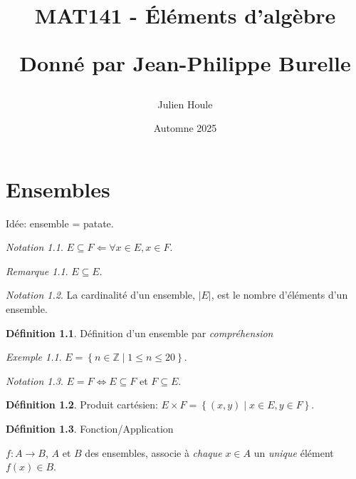 \documentclass{report}
\title{MAT141 - \'El\'ements d'alg\`ebre

Donn\'e par Jean-Philippe Burelle}
\author{Julien Houle}
\date{Automne 2025}
\newcommand*{\card}[1]{\left| #1 \right|}
\newcommand*{\lte}{\leqslant}
\newcommand*{\entiers}{\mathbb{Z}}
\theoremstyle{definition}
\newtheorem*{defin}{D\'efinition}
\theoremstyle{remark}
\newtheorem*{exem}{Exemple}
\newtheorem*{nota}{Notation}
\newtheorem*{rema}{Remarque}
\begin{document}
	\maketitle
	\tableofcontents
	\newpage

	\chapter{Ensembles}
	Id\'ee: ensemble = patate.


	\begin{nota}
		$E \subseteq F \Leftarrow \forall x \in E, x \in F$.
		\begin{rema}
			$E \subseteq E$.
		\end{rema}
	\end{nota}

	\begin{nota}
		La cardinalit\'e d'un ensemble, $\card{E}$, est le nombre d'\'el\'ements d'un ensemble.
	\end{nota}

	\begin{defin}
		D\'efinition d'un ensemble par \emph{compr\'ehension}
		\begin{exem}
			$E=\left\lbrace n \in \entiers \middle| 1 \lte n \lte 20 \right\rbrace$.
		\end{exem}
	\end{defin}

	\begin{nota}
		$E=F \Leftrightarrow E \subseteq F$ et $F \subseteq E$.
	\end{nota}

	\begin{defin}
		Produit cart\'esien: $E \times F=\left\lbrace (x,y) \middle| x \in E, y \in F \right\rbrace$.
	\end{defin}

	\begin{defin}
		Fonction/Application

		$f: A \to B$, $A$ et $B$ des ensembles, associe \`a \emph{chaque} $x \in A$ un \emph{unique} \'el\'ement $f(x) \in B$.
	\end{defin}
\end{document}
